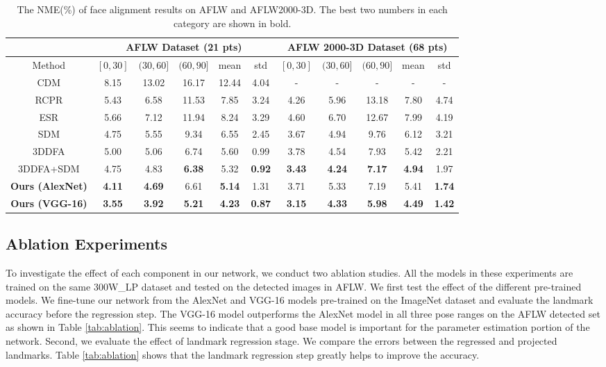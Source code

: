 \documentclass[10pt,twocolumn,letterpaper]{article}
\begin{document}
\begin{table*}[t!]
\centering
\caption{The NME(\%) of face alignment results on AFLW and AFLW2000-3D. The best two numbers in each category are shown in bold.}
\label{tab:exp_results}
\begin{tabular}{|c||c|c|c|c|c||c|c|c|c|c|}
\hline
 & \multicolumn{5}{c||}{AFLW Dataset (21 pts)} & \multicolumn{5}{c|}{AFLW 2000-3D Dataset (68 pts)} \\ \hline
Method & $[0, 30]$ & $(30, 60]$ & $(60, 90]$ & mean & std & $[0, 30]$ & $(30, 60]$ & $(60, 90]$ & mean & std \\ \hline
CDM & 8.15 & 13.02 & 16.17 & 12.44 & 4.04 & - & - & - & - & - \\ \hline
RCPR & 5.43 & 6.58 & 11.53 & 7.85 & 3.24 & 4.26 & 5.96 & 13.18 & 7.80 & 4.74\\ \hline
ESR & 5.66 & 7.12 & 11.94 & 8.24 & 3.29 & 4.60 & 6.70 & 12.67 & 7.99 & 4.19 \\ \hline
SDM & 4.75 & 5.55 & 9.34 & 6.55 & 2.45 & 3.67 & 4.94 & 9.76 & 6.12 & 3.21 \\ \hline
3DDFA & 5.00 & 5.06 & 6.74 & 5.60 & 0.99 & 3.78 & 4.54 & 7.93 & 5.42 & 2.21 \\ \hline
3DDFA+SDM & 4.75 & 4.83 & \textbf{6.38} & 5.32 & \textbf{0.92} & \textbf{3.43} & \textbf{4.24} & \textbf{7.17} & \textbf{4.94} & 1.97 \\
\hline
\textbf{Ours (AlexNet)} &\textbf{4.11} & \textbf{4.69} & 6.61 & \textbf{5.14} & 1.31 & 3.71 & 5.33 & 7.19 & 5.41 & \textbf{1.74} \\ \hline
\textbf{Ours (VGG-16)} & \textbf{3.55} & \textbf{3.92} & \textbf{5.21} & \textbf{4.23} & \textbf{0.87} & \textbf{3.15} & \textbf{4.33} & \textbf{5.98} & \textbf{4.49} & \textbf{1.42}  \\ \hline
\end{tabular}
\end{table*}

\subsection{Ablation Experiments}
To investigate the effect of each component in our network, we conduct two ablation studies. All the models in these experiments are trained on the same 300W\_LP dataset and tested on the detected images in AFLW. We first test the effect of the different pre-trained models. We fine-tune our network from the AlexNet and VGG-16 models pre-trained on the ImageNet dataset and evaluate the landmark accuracy before the regression step. The VGG-16 model outperforms the AlexNet model in all three pose ranges on the AFLW detected set as shown in Table \ref{tab:ablation}. This seems to indicate that a good base model is important for the parameter estimation portion of the network. Second, we evaluate the effect of landmark regression stage. We compare the errors between the regressed and projected landmarks. Table \ref{tab:ablation} shows that the landmark regression step greatly helps to improve the accuracy.
\end{document}

